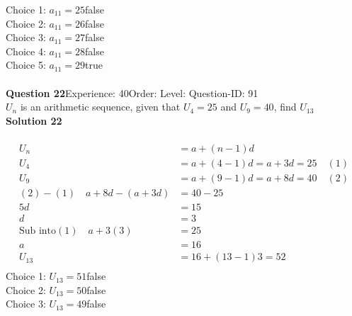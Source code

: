 \documentclass{article}
\begin{document}
Choice 1: \hspace{20pt}$a_{11}=25$\hspace{20pt}false\\
Choice 2: \hspace{20pt}$a_{11}=26$\hspace{20pt}false\\
Choice 3: \hspace{20pt}$a_{11}=27$\hspace{20pt}false\\
Choice 4: \hspace{20pt}$a_{11}=28$\hspace{20pt}false\\
Choice 5: \hspace{20pt}$a_{11}=29$\hspace{20pt}true\\
\\[4pt]
\noindent\textbf{Question 22}\hspace{20pt}Experience: 40\hspace{20pt}Order: \hspace{20pt}Level: \hspace{20pt}Question-ID: 91\\[2pt]
$U_n$ is an arithmetic sequence, given that $U_4=25$ and $U_9=40$, find $U_{13}$\\[4pt]
\noindent\textbf{Solution 22}\\[2pt]
\\[-35pt]\begin{align*}
U_n&=a+(n-1)d\\[2pt]
U_4&=a+(4-1)d=a+3d=25\quad (1)\\[2pt]
U_9&=a+(9-1)d=a+8d=40\quad (2)\\[2pt]
(2)-(1)\quad a+8d-(a+3d)&=40-25\\[2pt]
5d&=15\\[2pt]
d&=3\\[12pt]
\text{Sub into} (1) \quad a+3(3)&=25\\[2pt]
a&=16\\[12pt]
U_{13}&=16+(13-1)3=52\\[-40pt]
\end{align*}
Choice 1: \hspace{20pt}$U_{13}=51$\hspace{20pt}false\\
Choice 2: \hspace{20pt}$U_{13}=50$\hspace{20pt}false\\
Choice 3: \hspace{20pt}$U_{13}=49$\hspace{20pt}false\\
\end{document}
